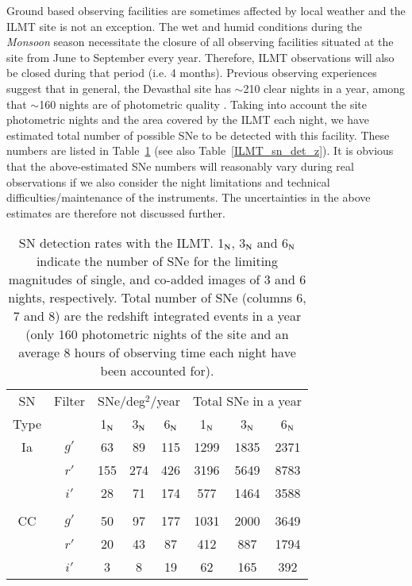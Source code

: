 \documentclass[useAMS,usenatbib]{mnras}
\begin{document}

Ground based observing facilities are sometimes affected by local weather and the ILMT site is 
not an exception. The wet and humid conditions during the {\it Monsoon} season necessitate the
closure of all observing facilities situated at the site from June to September every year.
Therefore, ILMT observations will also be closed during that period (i.e. 4 months). Previous 
observing experiences suggest that in general, the Devasthal site has $\sim$210 clear nights in a year, 
among that $\sim$160 nights are of photometric quality \citep[see][]{2000A&AS..144..349S}. 
Taking into account the site photometric nights and the area covered by the ILMT each night,
we have estimated total number of possible SNe to be detected with this facility. 
These numbers are listed in Table~\ref{ILMT_sn_det} (see also Table~\ref{ILMT_sn_det_z}).
It is obvious that the above-estimated SNe numbers will reasonably vary during real observations if we 
also consider the night limitations and technical difficulties/maintenance of the instruments. 
The uncertainties in the above estimates are therefore not discussed further.

 
\begin{table}
\centering
\small
\caption{SN detection rates with the ILMT.
1$_{\rm N}$, 3$_{\rm N}$ and 6$_{\rm N}$ indicate the number of SNe for the limiting magnitudes of 
single, and co-added images of 3 and 6 nights, respectively.
Total number of SNe (columns 6, 7 and 8) are the redshift integrated
events in a year (only 160 photometric nights of the site and an average 8 hours of observing
time each night have been accounted for).} \label{ILMT_sn_det}
\begin{tabular}{cccccccc}
\hline
SN   &Filter   & \multicolumn{3}{c}{SNe/deg$^{2}$/year}  & \multicolumn{3}{c}{Total SNe in a year}\\
Type &   & 1$_{\rm N}$ & 3$_{\rm N}$ & 6$_{\rm N}$ & 1$_{\rm N}$ & 3$_{\rm N}$ & 6$_{\rm N}$ \\ \hline
%
Ia   & $g'$   &63 & 89 & 115 & 1299 & 1835 & 2371 \\
     & $r'$   &155 & 274 & 426 & 3196 & 5649 & 8783 \\
     & $i'$   &28 & 71 & 174 & 577 & 1464 & 3588 \\\\      
CC   & $g'$   &50 & 97 & 177 & 1031 & 2000 & 3649 \\
     & $r'$   &20 & 43 & 87 & 412 & 887 & 1794 \\
     & $i'$   &3 & 8 & 19 & 62 & 165 & 392 \\
\hline
\end{tabular}
\end{table}
\end{document}

